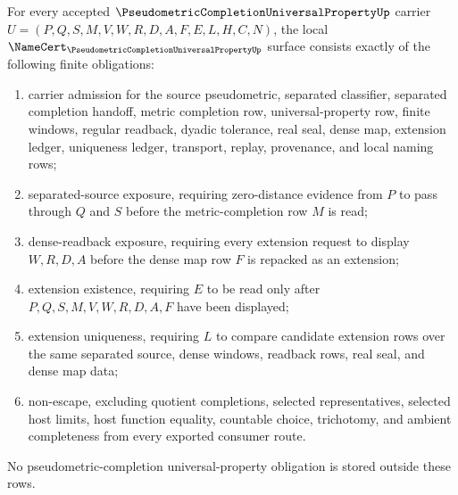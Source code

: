 \begin{theorem}
\label{thm:pseudometric-completion-universal-property-namecert-obligations}
For every accepted $\PseudometricCompletionUniversalPropertyUp$ carrier $U=(P,Q,S,M,V,W,R,D,A,F,E,L,H,C,N)$, the local $\NameCert_{\PseudometricCompletionUniversalPropertyUp}$ surface consists exactly of the following finite obligations:
\begin{enumerate}
\item carrier admission for the source pseudometric, separated classifier, separated completion handoff, metric completion row, universal-property row, finite windows, regular readback, dyadic tolerance, real seal, dense map, extension ledger, uniqueness ledger, transport, replay, provenance, and local naming rows;
\item separated-source exposure, requiring zero-distance evidence from $P$ to pass through $Q$ and $S$ before the metric-completion row $M$ is read;
\item dense-readback exposure, requiring every extension request to display $W,R,D,A$ before the dense map row $F$ is repacked as an extension;
\item extension existence, requiring $E$ to be read only after $P,Q,S,M,V,W,R,D,A,F$ have been displayed;
\item extension uniqueness, requiring $L$ to compare candidate extension rows over the same separated source, dense windows, readback rows, real seal, and dense map data;
\item non-escape, excluding quotient completions, selected representatives, selected host limits, host function equality, countable choice, trichotomy, and ambient completeness from every exported consumer route.
\end{enumerate}
No pseudometric-completion universal-property obligation is stored outside these rows.
\end{theorem}
